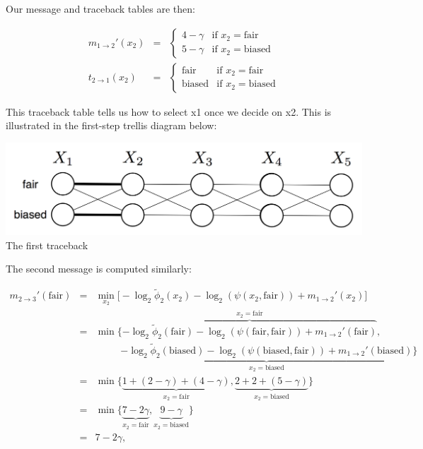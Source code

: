 \documentclass[6008notes.tex]{subfiles}
\begin{document}
Our message and traceback tables are then:

\begin{eqnarray*}
m_{1 \rightarrow 2}'(x_2)
&=& \begin{cases}
      4-\gamma & \text{if }x_2 = \text{fair} \\
      5-\gamma & \text{if }x_2 = \text{biased}
    \end{cases} \\
t_{2 \rightarrow 1}(x_2)
&=& \begin{cases}
      \text{fair} & \text{if }x_2 = \text{fair} \\
      \text{biased} & \text{if }x_2 = \text{biased}
    \end{cases}
\end{eqnarray*}

This traceback table tells us how to select x1 once we decide on x2. This is illustrated in the first-step trellis diagram below:

{\centering\includegraphics[scale=0.3]{images_sec-viterbi-trellis2}\\
The first traceback \par}

The second message is computed similarly:

\begin{eqnarray*}
m_{2\rightarrow 3}'(\text{fair})
&=& \min_{x_2}
      \big[ -\log_2\widetilde\phi_2(x_2) - \log_2(\psi(x_2, \text{fair}))
            + m_{1\rightarrow 2}'(x_2) \big] \\
&=& \min
      \big\{
        \overbrace{-\log_2\widetilde\phi_2(\text{fair})
          - \log_2(\psi(\text{fair}, \text{fair}))
          + m_{1\rightarrow 2}'(\text{fair})}^{x_2 = \text{fair}}, \\
&&\qquad\;\;
        \underbrace{-\log_2\widetilde\phi_2(\text{biased})
          - \log_2(\psi(\text{biased}, \text{fair}))
          + m_{1\rightarrow 2}'(\text{biased})}_{x_2 = \text{biased}}
      \big\} \\
&=& \min
      \big\{
        \underbrace{1 + (2 - \gamma) + (4 - \gamma)}_{x_2 = \text{fair}},
        \underbrace{2 + 2 + (5 - \gamma)}_{x_2 = \text{biased}}
      \big\} \\
&=& \min
      \big\{
        \underbrace{7 - 2\gamma}_{x_2 = \text{fair}},
        \underbrace{9 - \gamma}_{x_2 = \text{biased}}
      \big\} \\
&=& 7 - 2\gamma,
\end{eqnarray*}
\end{document}
